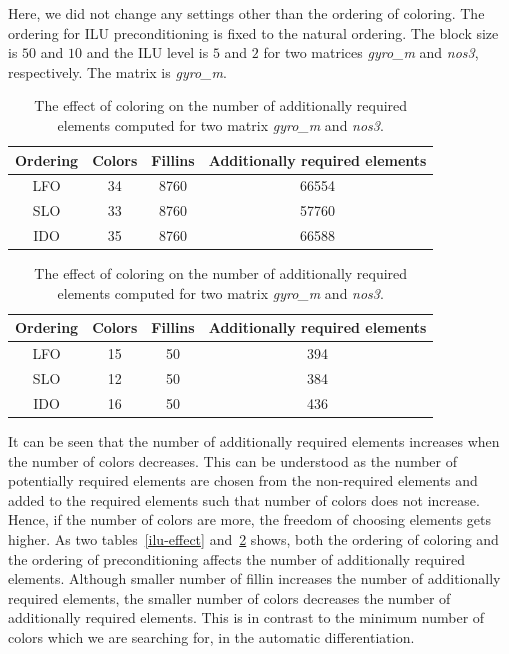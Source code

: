 \documentclass[12pt, oneside]{book}
\begin{document}
Here, we did not change any settings other than the ordering of coloring. The ordering for
ILU preconditioning is fixed to the natural ordering.
The block size is $50$ and $10$ and the ILU level is $5$ and $2$ for two matrices
\textit{gyro\_m} and \textit{nos3}, respectively.
The matrix is \textit{gyro\_m}.
\begin{table}
\begin{tabular}{|c|c|c|c|}
\hline
Ordering & Colors & Fillins & Additionally required elements \\\hline
LFO &  34 & 8760 & 66554 \\\hline
SLO &  33 & 8760 & 57760 \\\hline
IDO &  35 & 8760 & 66588 \\\hline
\end{tabular}
\begin{tabular}{|c|c|c|c|}
Ordering & Colors & Fillins & Additionally required elements \\\hline
LFO &  15 & 50 & 394 \\\hline
SLO &  12 & 50 & 384 \\\hline
IDO &  16 & 50 & 436 \\\hline
\end{tabular}
\caption{The effect of coloring on the number of additionally required elements
computed for two matrix \textit{gyro\_m} and \textit{nos3}. }
\label{col-effect}
\end{table}

It can be seen that the number of additionally required elements increases when 
the number of colors decreases. This can be understood as the number of potentially
required elements are chosen from the non-required elements and added to the required elements
such that number of colors does not increase. Hence, if the number of colors are more,
the freedom of choosing elements gets higher.
As two tables~\ref{ilu-effect} and~\ref{col-effect} shows, 
both the ordering of coloring and the ordering of preconditioning affects the number of
additionally required elements. Although smaller number of fillin increases
the number of additionally required elements, the smaller number of colors 
decreases the number of additionally required elements.
This is in contrast to the minimum number of colors which we are searching for, 
in the automatic differentiation.

\end{document}
